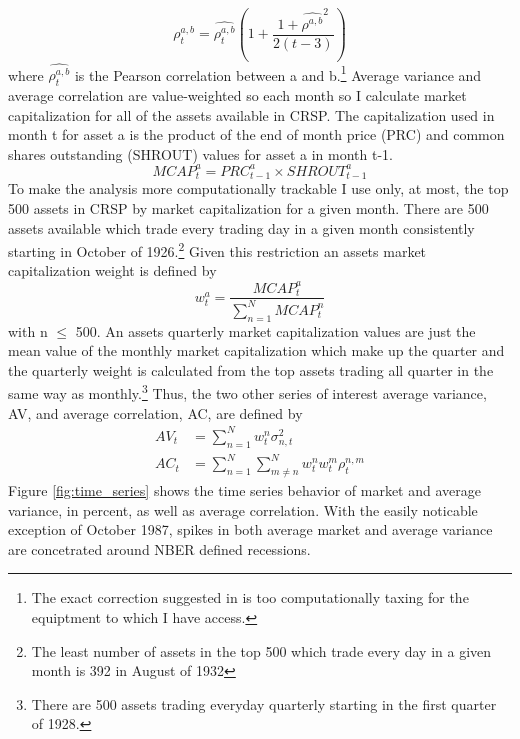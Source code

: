 \begin{equation}
	\rho^{a,b}_{t} = \widehat{\rho^{a,b}_{t}}\left(1 + \frac{1+\widehat{\rho^{a,b}}^{2}}{2(t-3)}\right)
\end{equation}
where $\widehat{\rho^{a,b}_{t}}$ is the Pearson correlation between a and b.\footnote{The exact correction suggested in \cite{olkin_1958} is too computationally taxing for the equiptment to which I have access.} Average variance and average correlation are value-weighted so each month so I calculate market capitalization for all of the assets available in CRSP. The capitalization used in month t for asset a is the product of the end of month price (PRC) and common shares outstanding (SHROUT) values for asset a in month t-1. 
\begin{equation}
MCAP^{a}_{t} = PRC^{a}_{t-1}\times SHROUT^{a}_{t-1}
\end{equation}
To make the analysis more computationally trackable I use only, at most, the top 500 assets in CRSP by market capitalization for a given month. There are 500 assets available which trade every trading day in a given month consistently starting in October of 1926.\footnote{The least number of assets in the top 500 which trade every day in a given month is 392 in August of 1932} Given this restriction an assets market capitalization weight is defined by
\begin{equation}
w^{a}_{t} = \frac{MCAP^{a}_{t}}{\sum_{n=1}^{N}MCAP^{n}_{t}}
\end{equation}
with n $\leq$ 500.
An assets quarterly market capitalization values are just the mean value of the monthly market capitalization which make up the quarter and the quarterly weight is calculated from the top assets trading all quarter in the same way as monthly.\footnote{There are 500 assets trading everyday quarterly starting in the first quarter of 1928.} Thus, the two other series of interest average variance, AV, and average correlation, AC, are defined by
\begin{align}
	AV_{t} &= \sum_{n=1}^{N} w^{n}_{t}\sigma^{2}_{n,t}\\
	AC_{t} &= \sum_{n=1}^{N}\sum_{m \neq n}^{N}w^{n}_{t}w^{m}_{t}\rho^{n,m}_{t}
\end{align}
Figure \ref{fig:time_series} shows the time series behavior of market and average variance, in percent, as well as average correlation. With the easily noticable exception of October 1987, spikes in both average market and average variance are concetrated around NBER defined recessions. \\
